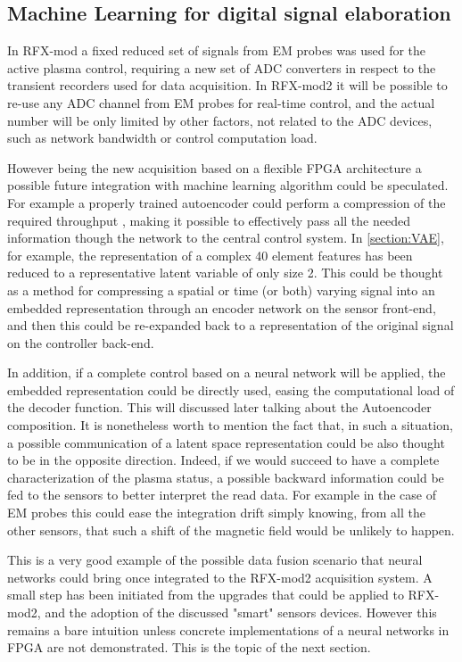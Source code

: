 \subsection*{Machine Learning for digital signal elaboration}

In RFX-mod a fixed reduced set of signals from EM probes was used for the active plasma control, requiring a new set of ADC converters in respect to the transient recorders used for data acquisition. In RFX-mod2 it will be possible to re-use any ADC channel from EM probes for real-time control, and the actual number will be only limited by other factors, not related to the ADC devices, such as network bandwidth or control computation load. 

However being the new acquisition based on a flexible FPGA architecture a possible future integration with machine learning algorithm could be speculated.
For example a properly trained autoencoder could perform a compression of the required throughput \cite{Zebang:2019:DCA:3313950.3313965}, making it possible to effectively pass all the needed information though the network to the central control system.
In \cref{section:VAE}, for example, the representation of a complex 40 element features has been reduced to a representative latent variable of only size 2. 
This could be thought as a method for compressing a spatial or time (or both) varying signal into an embedded representation through an encoder network on the sensor front-end, and then this could be re-expanded back to a representation of the original signal on the controller back-end.

In addition, if a complete control based on a neural network will be applied, the embedded representation could be directly used, easing the computational load of the decoder function. This will discussed later talking about the Autoencoder composition.
It is nonetheless worth to mention the fact that, in such a situation, a possible communication of a latent space representation could be also thought to be in the opposite direction. Indeed, if we would succeed to have a complete characterization of the plasma status, a possible backward information could be fed to the sensors to better interpret the read data.
For example in the case of EM probes this could ease the integration drift simply knowing, from all the other sensors, that such a shift of the magnetic field would be unlikely to happen.

This is a very good example of the possible data fusion scenario that neural networks could bring once integrated to the RFX-mod2 acquisition system.
A small step has been initiated from the upgrades that could be applied to RFX-mod2, and the adoption of the discussed "smart" sensors devices.
However this remains a bare intuition unless concrete implementations of a neural networks in FPGA are not demonstrated.
This is the topic of the next section.










